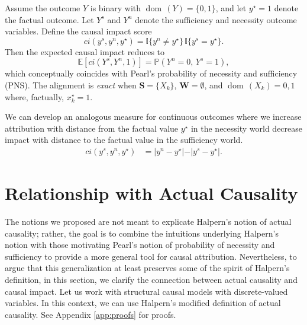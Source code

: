\documentclass[anon,12pt]{clear2026} %
\newcommand{\dom}{\operatorname{dom}\,}
\begin{document}
\begin{example}
Assume \linebreak the outcome $Y$ is binary with $\dom(Y)=\{0,1\}$, and let $y^\star=1$ denote
the factual outcome. Let $Y^s$ and $Y^n$ denote the sufficiency and necessity
outcome variables. Define the causal impact score
\[
ci(y^s,y^n,y^\star)
=
\mathbb{I}\{y^n\neq y^\star\}\,\mathbb{I}\{y^s=y^\star\}.
\]
Then the expected causal impact reduces to
\[
\mathbb{E}\!\left[ci(Y^s,Y^n,1)\right]
=
\mathbb{P}(Y^n=0,\,Y^s=1),
\]
which conceptually coincides with Pearl’s probability of necessity and sufficiency (PNS). The alignment is \emph{exact} when $\mathbf{S} = \{X_k\}$, $\mathbf{W}=\emptyset$, and $\dom(X_k)={0,1}$ where, factually, $x_k^\star=1$.
\end{example}

\begin{example} \label{ex:absolute_score}
We can develop an analogous measure for continuous outcomes where we increase attribution with distance from the factual value $y^\star$ in the necessity world decrease impact with distance to the factual value in the sufficiency world.
\begin{align*}
ci(y^s, y^n, y^\star) & = \vert y^n - y^\star \vert   - \vert y^s - y ^\star \vert. 
\end{align*}
\end{example}

\section{Relationship with Actual Causality}\label{sec:th_ac}

The notions we proposed are not meant to explicate Halpern's notion of actual causality; rather, the goal is to combine the intuitions underlying Halpern's notion with those motivating Pearl's notion of probability of necessity and sufficiency to provide a more general tool for causal attribution.
Nevertheless, to argue that this generalization at least preserves some of the spirit of Halpern's definition, in this section, we clarify the connection between actual causality and causal impact. 
Let us work with structural causal models with discrete-valued variables.
In this context, we can use Halpern's modified definition of actual causality. See Appendix \ref{app:proofs} for proofs.
\end{document}
